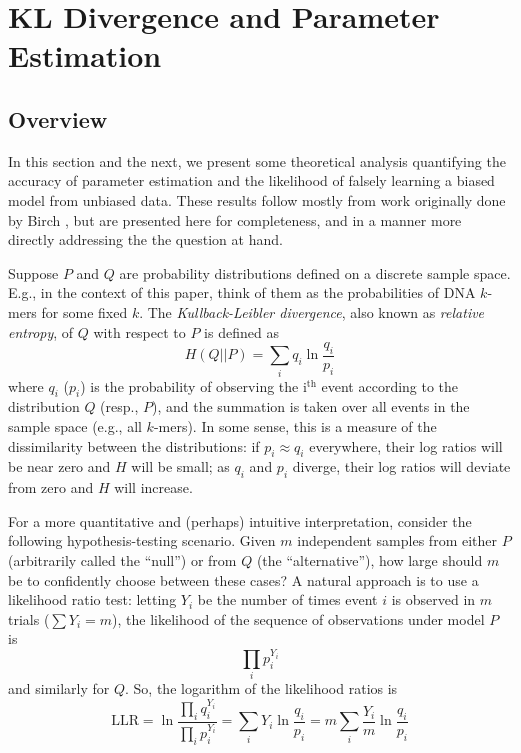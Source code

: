\documentclass[letterpaper]{article}
\begin{document}
\section{KL Divergence and Parameter Estimation}

\subsection{Overview}

In this section and the next, we present some theoretical analysis quantifying
the accuracy of parameter estimation and the likelihood of falsely learning a
biased model from unbiased data. These results follow mostly from work
originally done by Birch \cite{Birch1964}, but are presented here for
completeness, and in a manner more directly addressing the the question at hand.

Suppose $P$ and $Q$ are probability distributions defined on a discrete sample
space. E.g., in the context of this paper, think of them as the probabilities of
DNA $k$-mers for some fixed $k$. The \emph{Kullback-Leibler divergence}, also
known as \emph{relative entropy}, of $Q$ with respect to $P$ is defined as
$$H(Q||P) = \sum_{i} q_i \ln \frac{q_{i}}{p_{i}}$$
where $q_{i}$ ($p_{i}$) is the probability of observing the i$^{\text{th}}$
event according to the distribution $Q$ (resp., $P$), and the summation is taken
over all events in the sample space (e.g., all $k$-mers). In some sense, this is
a measure of the dissimilarity between the distributions: if $p_{i} \approx
q_{i}$ everywhere, their log ratios will be near zero and $H$ will be small; as
$q_{i}$ and $p_{i}$ diverge, their log ratios will deviate from zero and $H$
will increase.

For a more quantitative and (perhaps) intuitive interpretation, consider the
following hypothesis-testing scenario. Given $m$ independent samples from either
$P$ (arbitrarily called the ``null'') or from $Q$ (the ``alternative''), how
large should $m$ be to confidently choose between these cases? A natural
approach is to use a likelihood ratio test: letting $Y_i$ be the number of times
event $i$ is observed in $m$ trials ($\sum Y_i = m$), the likelihood of the
sequence of observations under model $P$ is $$\prod_{i} p_{i}^{Y_{i}}$$
and similarly for $Q$. So, the logarithm of the likelihood ratios is
$$
\text{LLR} =
\ln \frac{\prod_{i} q_{i} ^ {Y_{i}}}{\prod_{i} p_{i} ^ {Y_{i}}}
= \sum_{i} Y_{i} \ln \frac{q_{i}}{p_{i}}
= m \sum_{i} \frac{Y_{i}}{m} \ln \frac{q_{i}}{p_{i}} $$
\end{document}
